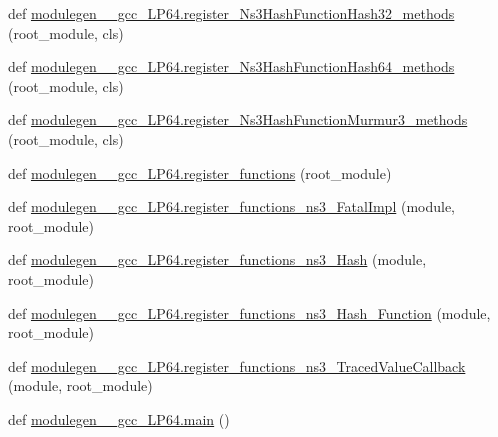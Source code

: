 \begin{DoxyCompactItemize}
\item 
def \hyperlink{namespacemodulegen____gcc__LP64_a9e34b1934e0920db80354937fe083ff8}{modulegen\+\_\+\+\_\+gcc\+\_\+\+L\+P64.\+register\+\_\+\+Ns3\+Hash\+Function\+Hash32\+\_\+methods} (root\+\_\+module, cls)
\item 
def \hyperlink{namespacemodulegen____gcc__LP64_a082871bd62d0a4db1581a4a5a90ef0ac}{modulegen\+\_\+\+\_\+gcc\+\_\+\+L\+P64.\+register\+\_\+\+Ns3\+Hash\+Function\+Hash64\+\_\+methods} (root\+\_\+module, cls)
\item 
def \hyperlink{namespacemodulegen____gcc__LP64_adca5cdfc5ab708e8c329dbbc45251f75}{modulegen\+\_\+\+\_\+gcc\+\_\+\+L\+P64.\+register\+\_\+\+Ns3\+Hash\+Function\+Murmur3\+\_\+methods} (root\+\_\+module, cls)
\item 
def \hyperlink{namespacemodulegen____gcc__LP64_aec4a5f753ed5fb80e971fb72341c9052}{modulegen\+\_\+\+\_\+gcc\+\_\+\+L\+P64.\+register\+\_\+functions} (root\+\_\+module)
\item 
def \hyperlink{namespacemodulegen____gcc__LP64_a50e31627c725d62dd753bad9b750a7a2}{modulegen\+\_\+\+\_\+gcc\+\_\+\+L\+P64.\+register\+\_\+functions\+\_\+ns3\+\_\+\+Fatal\+Impl} (module, root\+\_\+module)
\item 
def \hyperlink{namespacemodulegen____gcc__LP64_aaccaa7a88652c7cf1cbe4bae23dfd70f}{modulegen\+\_\+\+\_\+gcc\+\_\+\+L\+P64.\+register\+\_\+functions\+\_\+ns3\+\_\+\+Hash} (module, root\+\_\+module)
\item 
def \hyperlink{namespacemodulegen____gcc__LP64_ac5702d84dcfdab4237af2580ad57e6cd}{modulegen\+\_\+\+\_\+gcc\+\_\+\+L\+P64.\+register\+\_\+functions\+\_\+ns3\+\_\+\+Hash\+\_\+\+Function} (module, root\+\_\+module)
\item 
def \hyperlink{namespacemodulegen____gcc__LP64_a598936972a1d732adf3c766e058929eb}{modulegen\+\_\+\+\_\+gcc\+\_\+\+L\+P64.\+register\+\_\+functions\+\_\+ns3\+\_\+\+Traced\+Value\+Callback} (module, root\+\_\+module)
\item 
def \hyperlink{namespacemodulegen____gcc__LP64_a78c8b268d5fecc4d52d220f8954d0345}{modulegen\+\_\+\+\_\+gcc\+\_\+\+L\+P64.\+main} ()
\end{DoxyCompactItemize}
